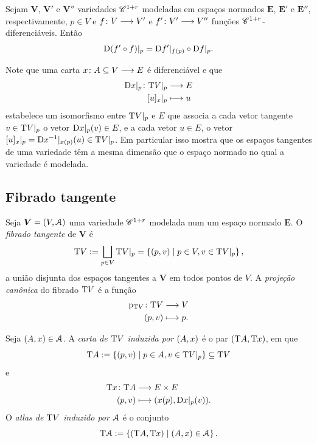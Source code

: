 \begin{proposition}
Sejam $\bm V$, $\bm V'$ e $\bm V''$ variedades $\mathscr{C}^{1+r}$ modeladas em espaços normados $\bm E$, $\bm E'$ e $\bm E''$, respectivamente, $p \in V$ e $f\colon \allowbreak V \longrightarrow V'$ e $f'\colon \allowbreak V' \longrightarrow V''$ funções $\mathscr{C}^{1+r}$-diferenciáveis. Então
	\begin{equation*}
	\mathrm{D} (f' \circ f)|_{p} = \mathrm{D} f'|_{f(p)} \circ \mathrm{D} f|_{p}.
	\end{equation*}
\end{proposition}

Note que uma carta $x\colon \allowbreak A \subseteq V \longrightarrow E$ é diferenciável e que
	\begin{align*}
	{\mathrm{D}x|_p}\colon {\mathrm{T}V|_p} &\longrightarrow {E} \\{[u]_{x}|_p} &\longmapsto u
	\end{align*}
estabelece um isomorfismo entre $\mathrm{T} V|_p$ e $E$ que associa a cada vetor tangente $v \in \mathrm{T} V|_p$ o vetor $\mathrm{D}x|_p(v) \in E$, e a cada vetor $u \in E$, o vetor $[u]_{x}|_p = \mathrm{D} x^{-1}|_{x(p)}(u) \in \mathrm{T} V|_p$. Em particular isso mostra que os espaços tangentes de uma variedade têm a mesma dimensão que o espaço normado no qual a variedade é modelada.




\subsection{Fibrado tangente}

\begin{definition}
Seja $\bm V = (V, \mathcal{A})$ uma variedade $\mathscr{C}^{1+r}$ modelada num um espaço normado $\bm E$. O \emph{fibrado tangente} de $\bm V$ é
	\begin{equation*}
	\mathrm{T} V := \bigsqcup_{p \in V} \mathrm{T} V|_p = \left\{ (p,v) \;\middle\vert\; p \in V,v \in \mathrm{T} V|_p \right\},
	\end{equation*}
a união disjunta dos espaços tangentes a $\bm V$ em todos pontos de $V$. A \emph{projeção canônica} do fibrado $\mathrm{T} V$ é a função
	\begin{align*}
	{\mathrm{p}_{\mathrm{T}V}}\colon {\mathrm{T}V} &\longrightarrow {V} \\{(p, v)} &\longmapsto p.
	\end{align*}

Seja $(A,x) \in \mathcal{A}$. A \emph{carta de $\mathrm{T} V$ induzida por $(A,x)$} é o par $(\mathrm{T} A, \mathrm{T} x)$, em que
	\begin{equation*}
	\mathrm{T} A := \left\{ (p,v) \;\middle\vert\; p \in A, v \in \mathrm{T} V|_p \right\} \subseteq \mathrm{T} V
	\end{equation*}
e
	\begin{align*}
		{\mathrm{T}x}\colon {\mathrm{T}A} &\longrightarrow {E \times E} \\{(p, v)} &\longmapsto (x(p), \mathrm{D}x|_p(v)).
	\end{align*}
O \emph{atlas de $\mathrm{T} V$ induzido por $\mathcal{A}$} é o conjunto
	\begin{equation*}
	\mathrm{T} \mathcal{A} := \left\{ (\mathrm{T} A, \mathrm{T} x) \;\middle\vert\; (A,x) \in \mathcal{A} \right\}.
	\end{equation*}
\end{definition}

